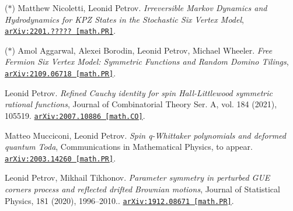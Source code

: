 \begin{etaremune}
\renewcommand{\labelenumi}{[\theenumi]}


\item ($*$)
Matthew Nicoletti, Leonid Petrov.
\emph{Irreversible Markov Dynamics and Hydrodynamics for KPZ States in the Stochastic Six Vertex Model}, 
\href{https://arxiv.org/abs/2201.?????}{\texttt{arXiv:2201.????? [math.PR]}}.









\item ($*$)
Amol Aggarwal, Alexei Borodin, Leonid Petrov, Michael Wheeler.
\emph{Free Fermion Six Vertex Model: Symmetric Functions and Random Domino Tilings}, 
\href{https://arxiv.org/abs/2109.06718}{\texttt{arXiv:2109.06718 [math.PR]}}.

















\item 
Leonid Petrov.
\emph{Refined Cauchy identity for spin Hall-Littlewood symmetric rational functions}, Journal of Combinatorial Theory Ser. A, vol. 184 (2021), 105519. 
\href{https://arxiv.org/abs/2007.10886}{\texttt{arXiv:2007.10886 [math.CO]}}.







\item 
Matteo Mucciconi, Leonid Petrov.
\emph{Spin q-Whittaker polynomials and deformed quantum Toda}, Communications in Mathematical Physics, to appear. 
\href{https://arxiv.org/abs/2003.14260}{\texttt{arXiv:2003.14260 [math.PR]}}.









\item 
Leonid Petrov, Mikhail Tikhonov.
\emph{Parameter symmetry in perturbed GUE corners process and reflected drifted Brownian motions}, Journal of Statistical Physics, 181 (2020), 1996–2010.. 
\href{https://arxiv.org/abs/1912.08671}{\texttt{arXiv:1912.08671 [math.PR]}}.




\end{etaremune}
